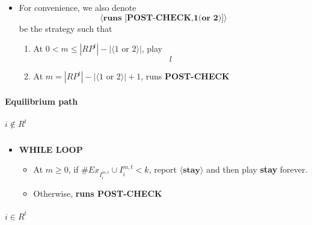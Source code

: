 \documentclass[12pt]{article}
\newtheorem{lemma}{Lemma}[subsection]
\theoremstyle{remark}
\theoremstyle{remark}
\begin{document}
\begin{itemize}
\begin{lemma}
\label{lemma_no_node_outside}
If the network is a tree and the state has Strong Connectivity, then 
\[i\in C \Rightarrow \text{there is no node outside of }\bigcup_{k\in N^{t-1}_i}G_k\]
\end{lemma}

\begin{proof}
In appendix.
\end{proof}


\item For convenience, we also denote
\[\langle\textbf{runs [POST-CHECK,1(or 2)]}\rangle\]
be the strategy such that
\begin{enumerate}
\item At $0<m\leq |RP^t|-|\langle 1\text{ or 2} \rangle|$, play
\[ l \]
\item At $m= |RP^t|-|\langle 1\text{ or 2} \rangle|+1$, runs \textbf{POST-CHECK}
\end{enumerate}



\end{itemize}














\paragraph{Equilibrium path}



\subparagraph{$i\notin R^{t}$}




\begin{itemize}
\item \textbf{WHILE LOOP}
\begin{itemize}
\item At $m\geq 0$, if $\#Ex_{I^{m,t}_i}\cup I^{m,t}_i< k$, report $\langle \textbf{stay} \rangle$ and then play \textbf{stay} forever.
\item Otherwise, \textbf{runs POST-CHECK }
\end{itemize}
\end{itemize}

\subparagraph{$i\in R^{t}$}
\end{document}
